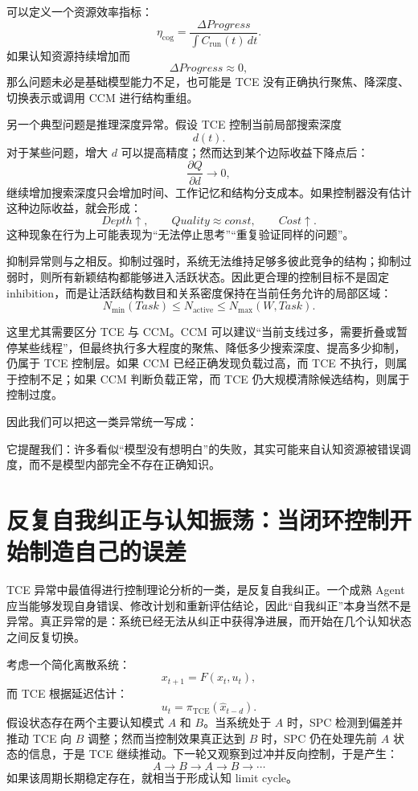 可以定义一个资源效率指标：
\[
\eta_{\mathrm{cog}}
=
\frac{
\Delta Progress
}{
\int C_{\mathrm{run}}(t)\,dt
}.
\]
如果认知资源持续增加而
\[
\Delta Progress\approx 0,
\]
那么问题未必是基础模型能力不足，也可能是 TCE 没有正确执行聚焦、降深度、切换表示或调用 CCM 进行结构重组。

另一个典型问题是推理深度异常。假设 TCE 控制当前局部搜索深度
\[
d(t).
\]
对于某些问题，增大 \(d\) 可以提高精度；然而达到某个边际收益下降点后：
\[
\frac{\partial Q}{\partial d}
\rightarrow 0,
\]
继续增加搜索深度只会增加时间、工作记忆和结构分支成本。如果控制器没有估计这种边际收益，就会形成：
\[
Depth\uparrow
,\qquad
Quality\approx const
,\qquad
Cost\uparrow.
\]
这种现象在行为上可能表现为“无法停止思考”“重复验证同样的问题”。

抑制异常则与之相反。抑制过强时，系统无法维持足够多彼此竞争的结构；抑制过弱时，则所有新颖结构都能够进入活跃状态。因此更合理的控制目标不是固定 inhibition，而是让活跃结构数目和关系密度保持在当前任务允许的局部区域：
\[
N_{\min}(Task)
\leq
N_{\mathrm{active}}
\leq
N_{\max}(W,Task).
\]

这里尤其需要区分 TCE 与 CCM。CCM 可以建议“当前支线过多，需要折叠或暂停某些线程”，但最终执行多大程度的聚焦、降低多少搜索深度、提高多少抑制，仍属于 TCE 控制层。如果 CCM 已经正确发现负载过高，而 TCE 不执行，则属于控制不足；如果 CCM 判断负载正常，而 TCE 仍大规模清除候选结构，则属于控制过度。

因此我们可以把这一类异常统一写成：
\begin{statementbox}
\centering
{}
\end{statementbox}
它提醒我们：许多看似“模型没有想明白”的失败，其实可能来自认知资源被错误调度，而不是模型内部完全不存在正确知识。

\section{反复自我纠正与认知振荡：当闭环控制开始制造自己的误差}

TCE 异常中最值得进行控制理论分析的一类，是反复自我纠正。一个成熟 Agent 应当能够发现自身错误、修改计划和重新评估结论，因此“自我纠正”本身当然不是异常。真正异常的是：系统已经无法从纠正中获得净进展，而开始在几个认知状态之间反复切换。

考虑一个简化离散系统：
\[
x_{t+1}
=
F(x_t,u_t),
\]
而 TCE 根据延迟估计：
\[
u_t
=
\pi_{\mathrm{TCE}}
(\hat x_{t-d}).
\]
假设状态存在两个主要认知模式 \(A\) 和 \(B\)。当系统处于 \(A\) 时，SPC 检测到偏差并推动 TCE 向 \(B\) 调整；然而当控制效果真正达到 \(B\) 时，SPC 仍在处理先前 \(A\) 状态的信息，于是 TCE 继续推动。下一轮又观察到过冲并反向控制，于是产生：
\[
A
\rightarrow
B
\rightarrow
A
\rightarrow
B
\rightarrow
\cdots
\]
如果该周期长期稳定存在，就相当于形成认知 limit cycle。

